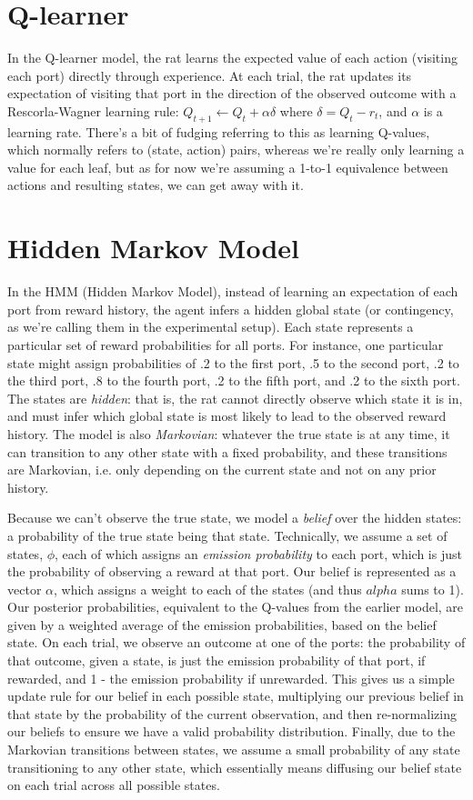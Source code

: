 \documentclass[11pt]{article}
\begin{document}
\section{Q-learner}
In the Q-learner model, the rat learns the expected value of each action (visiting each port) directly through experience. At each trial, the rat updates its expectation of visiting that port in the direction of the observed outcome with a Rescorla-Wagner learning rule: $Q_{t+1} \leftarrow Q_t + \alpha \delta$ where $\delta = Q_t-r_t$, and $\alpha$ is a learning rate. There's a bit of fudging referring to this as learning Q-values, which normally refers to (state, action) pairs, whereas we're really only learning a value for each leaf, but as for now we're assuming a 1-to-1 equivalence between actions and resulting states, we can get away with it.
\section{Hidden Markov Model}
In the HMM (Hidden Markov Model), instead of learning an expectation of each port from reward history, the agent infers a hidden global state (or contingency, as we're calling them in the experimental setup). Each state represents a particular set of reward probabilities for all ports. For instance, one particular state might assign probabilities of .2 to the first port, .5 to the second port, .2 to the third port, .8 to the fourth port, .2 to the fifth port, and .2 to the sixth port. The states are \textit{hidden}: that is, the rat cannot directly observe which state it is in, and must infer which global state is most likely to lead to the observed reward history. The model is also \textit{Markovian}: whatever the true state is at any time, it can transition to any other state with a fixed probability, and these transitions are Markovian, i.e. only depending on the current state and not on any prior history.

Because we can't observe the true state, we model a \textit{belief} over the hidden states: a probability of the true state being that state. Technically, we assume a set of states, $\phi$, each of which assigns an \textit{emission probability} to each port, which is just the probability of observing a reward at that port. Our belief is represented as a vector $\alpha$, which assigns a weight to each of the states (and thus $alpha$ sums to 1). Our posterior probabilities, equivalent to the Q-values from the earlier model, are given by a weighted average of the emission probabilities, based on the belief state. On each trial, we observe an outcome at one of the ports: the probability of that outcome, given a state, is just the emission probability of that port, if rewarded, and 1 - the emission probability if unrewarded. This gives us a simple update rule for our belief in each possible state, multiplying our previous belief in that state by the probability of the current observation, and then re-normalizing our beliefs to ensure we have a valid probability distribution. Finally, due to the Markovian transitions between states, we assume a small probability of any state transitioning to any other state, which essentially means diffusing our belief state on each trial across all possible states.
\end{document}
